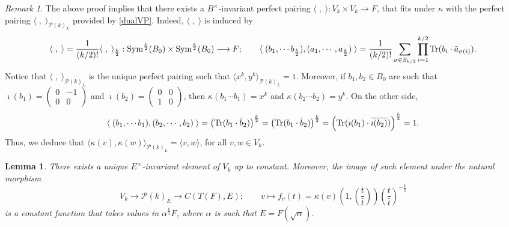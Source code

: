 \documentclass{amsart}
\newtheorem{lemma}[theorem]{Lemma}
\theoremstyle{definition}
\theoremstyle{remark}
\newtheorem{remark}[theorem]{Remark}
\numberwithin{equation}{section}
\newcommand{\ipa}[1]{\left(#1\right)}
\newcommand{\cP}{{\mathcal P}}
\begin{document}
\begin{remark}\label{dualVkmodelpairing}
    The above proof implies that there exists a $B^\times$-invariant perfect pairing 
    $\langle\;,\;\rangle:V_k\times V_k\rightarrow F$,
    that fits under $\kappa$ with the perfect pairing $\langle\;,\;\rangle_{\cP(k)_L}$ provided by \eqref{dualVP}. Indeed, $\langle\;,\;\rangle$ is induced by 
    \[
    \langle\;,\;\rangle=\frac{1}{(k/2)!}\langle\;,\;\rangle_{\frac{k}{2}}:{\rm Sym}^{\frac{k}{2}}(B_0)\times {\rm Sym}^{\frac{k}{2}}(B_0)\longrightarrow F;\qquad \langle\;(b_1,\cdots b_{\frac{k}{2}}),(a_1,\cdots,a_{\frac{k}{2}})\;\rangle=\frac{1}{(k/2)!}\sum_{\sigma\in S_{k/2}}\prod_{i=1}^{k/2}{\rm Tr}(b_i\cdot \bar a_{\sigma(i)}).
    \]
    Notice that $\langle\;,\;\rangle_{\cP(k)_L}$ is the unique perfect pairing such that $\langle x^k,y^k\rangle_{\cP(k)_L}=1$. Moreover, if $b_1,b_2\in B_0$ are such that
    $\imath(b_1)=\left(\begin{smallmatrix}
        0&-1\\0&0
    \end{smallmatrix}\right)$ and $\imath(b_2)=\left(\begin{smallmatrix}
        0&0\\1&0
    \end{smallmatrix}\right)$, then $\kappa(b_1\cdots b_1)=x^k$ and $\kappa(b_2\cdots b_2)=y^k$. On the other side, 
    \[
    \langle\;(b_1,\cdots b_1),(b_2,\cdots,b_2)\;\rangle=\left({\rm Tr}(b_1\cdot \bar b_2)\right)^{\frac{k}{2}}=\left({\rm Tr}(b_1\cdot \bar b_2)\right)^{\frac{k}{2}}=\left({\rm Tr}(\imath(b_1)\cdot \overline{\imath(b_2)})\right)^{\frac{k}{2}}=1.
    \]
    Thus, we deduce that $\langle\kappa(v),\kappa(w)\rangle_{\cP(k)_L}=\langle v,w\rangle$, for all $v,w\in V_k$.
\end{remark}
\begin{lemma}\label{rationalinvariants}
    There exists a unique $E^\times$-invariant element of $V_k$ up to constant. Moreover, the image of such element under the natural morphism
    \begin{equation*}
    V_k\longrightarrow\cP(k)_E\longrightarrow C(T(F),E);\qquad v\longmapsto f_{v}(t)=\kappa\left(v\right)\ipa{1,\ipa{\frac{t}{\bar t}}}\ipa{\frac{t}{\bar t}}^{-\frac{k}{2}}
\end{equation*}
is a constant function that takes values in $\alpha^{\frac{k}{4}}F$, where $\alpha$ is such that $E=F(\sqrt{\alpha})$.
\end{lemma}
\end{document}
